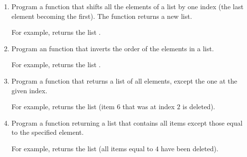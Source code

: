 \documentclass[11pt,class=report,crop=false]{standalone}
\begin{document}
\begin{activite}


\begin{enumerate}
  \item Program a  function that shifts all the elements of a list by one index (the last element becoming the first). The function returns a new list.
  
  For example,  returns the list \ci{[4,1,2,3]}.
  
  \item Program an  function that inverts the order of the elements in a list. 
  
  For example,  returns the list \ci{[4,3,2,1]}.
  
  \item Program a  function that returns a list of all elements, except the one at the given index. 
  
  For example,  returns the list \ci{[8,7,5,4]} (item $6$ that was at index $2$ is deleted).
  
    \item Program a  function returning a list that contains all items except those equal to the specified element. 
    
 For example,  returns the list \ci{[8,7,6,5]} (all items equal to $4$ have been deleted).
    
\end{enumerate}

\end{activite}
\end{document}
